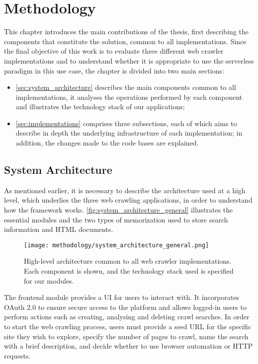 \documentclass[../thesis.tex]{subfiles}
\begin{document}
\chapter{Methodology}\label{cap:methodology}
This chapter introduces the main contributions of the thesis, first describing the components that constitute the solution, common to all implementations. Since the final objective of this work is to evaluate three different web crawler implementations and to understand whether it is appropriate to use the serverless paradigm in this use case, the chapter is divided into two main sections:

\begin{itemize}
    \item \autoref{sec:system_architecture} describes the main components common to all implementations, it analyses the operations performed by each component and illustrates the technology stack of our applications;
    \item \autoref{sec:implementations} comprises three subsections, each of which aims to describe in depth the underlying infrastructure of each implementation; in addition, the changes made to the code bases are explained.
\end{itemize}

\section{System Architecture}\label{sec:system_architecture}
As mentioned earlier, it is necessary to describe the architecture used at a high level, which underlies the three web crawling applications, in order to understand how the framework works. \autoref{fig:system_architecture_general} illustrates the essential modules and the two types of memorization used to store search information and \acrshort{HTML} documents.

\begin{figure}[H]
    \centering
    \texttt{[image: methodology/system\_architecture\_general.png]}
    \caption[High-level web crawlers architecture]{High-level architecture common to all web crawler implementations. Each component is shown, and the technology stack used is specified for our modules.}
    \label{fig:system_architecture_general}
\end{figure}

The frontend module provides a \acrshort{UI} for users to interact with. It incorporates \acrfull{OAuth 2.0} to ensure secure access to the platform and allows logged-in users to perform actions such as creating, analysing and deleting crawl searches. In order to start the web crawling process, users must provide a seed \acrshort{URL} for the specific site they wish to explore, specify the number of pages to crawl, name the search with a brief description, and decide whether to use browser automation or \acrshort{HTTP} requests.
\end{document}
